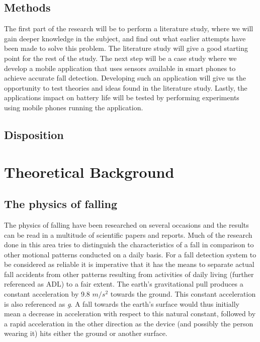 \documentclass[12pt, a4paper, onecolumn]{article}
\begin{document}
		\subsection{Methods}
		
		The first part of the research will be to perform a literature study, where we will gain deeper knowledge in the subject, and find out what earlier attempts have been made to solve this problem. The literature study will give a good starting point for the rest of the study. The next step will be a case study where we develop a mobile application that uses sensors available in smart phones to achieve accurate fall detection. Developing such an application will give us the opportunity to test theories and ideas found in the literature study. Lastly, the applications impact on battery life will be tested by performing experiments using mobile phones running the application.
		
		\subsection{Disposition}
		
	\newpage
	
	\section{Theoretical Background}
	
	\subsection{The physics of falling}
	The physics of falling have been researched on several occasions and the results can be read in a multitude of scientific papers and reports. Much of the research done in this area tries to distinguish the characteristics of a fall in comparison to other motional patterns conducted on a daily basis. For a fall detection system to be considered as reliable it is imperative that it has the means to separate actual fall accidents from other patterns resulting from activities of daily living (further referenced as ADL) to a fair extent. The earth's gravitational pull produces a constant acceleration by 9.8 $m/s^{2}$ towards the ground. This constant acceleration is also referenced as \textit{g}. A fall towards the earth's surface would thus initially mean a decrease in acceleration with respect to this natural constant, followed by a rapid acceleration in the other direction as the device (and possibly the person wearing it) hits either the ground or another surface.
	
\end{document}
